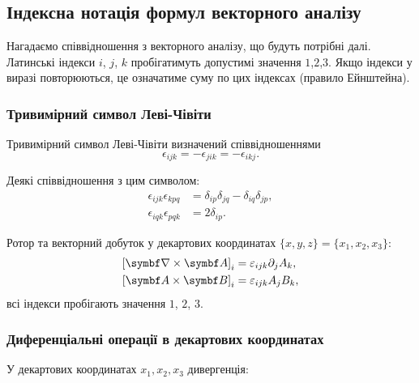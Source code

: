 \subsection{Індексна нотація формул векторного аналізу}

Нагадаємо співвідношення з векторного аналізу, що будуть потрібні далі.
Латинські індекси $i$, $j$, $k$ пробігатимуть допустимі значення $1$,$2$,$3$. Якщо індекси
у виразі повторюються, це означатиме суму по цих індексах (правило
Ейнштейна).

\subsubsection{Тривимірний символ Леві-Чівіти}\label{Levi-Chiv}

Тривимірний символ Леві-Чівіти визначений співвідношеннями
\begin{equation}\label{eq:Levi-Chiv}
\epsilon_{ijk} =  - \epsilon_{jik} =  - \epsilon_{ikj}.
\end{equation}

Деякі співвідношення з цим символом:
\begin{align}
    \epsilon_{ijk}\epsilon_{kpq} &= \delta_{ip}\delta_{jq} - \delta_{iq}\delta_{jp}, \\
    \epsilon_{iqk}\epsilon_{pqk} &= 2\delta _{ip}.
\end{align}

Ротор та векторний добуток у декартових координатах $\{x,y,z\} = \{x_1, x_2, x_3\}$:
\begin{align}
\left[\rot\vect{A} \right]_i &= \epsilon_{ijk}{\partial_j}{A_k}, \\
\left[ \vect{A} \times \vect{B} \right]_i &= \epsilon_{ijk}{A_j}{B_k},
\end{align}
всі індекси пробігають значення $1$, $2$, $3$.

\subsubsection{Диференціальні операції в декартових координатах}


У декартових координатах \( x_1, x_2, x_3 \) дивергенція:

